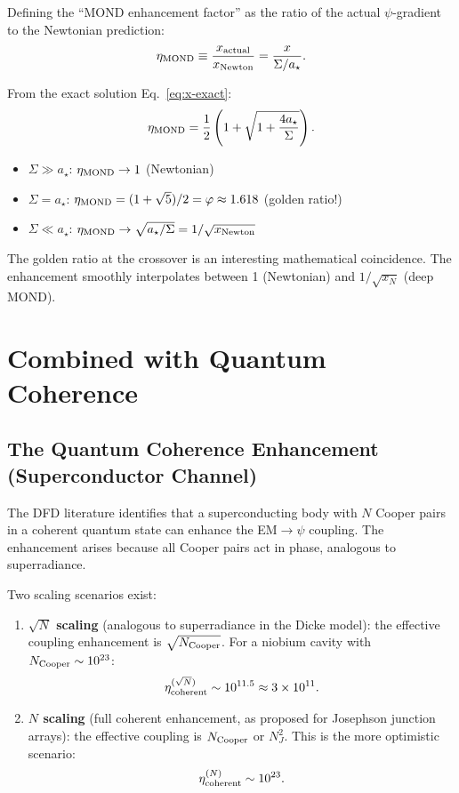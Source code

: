 \documentclass[aps,prd,twocolumn,superscriptaddress,nofootinbib]{revtex4-2}
\newcommand{\astar}{a_\star}
\newcommand{\ee}[1]{\times 10^{#1}}
\begin{document}
Defining the ``MOND enhancement factor'' as the ratio of the
actual $\psi$-gradient to the Newtonian prediction:
\begin{equation}
\eta_{\rm MOND} \equiv \frac{x_{\rm actual}}{x_{\rm Newton}}
= \frac{x}{\Sigma/\astar}.
\end{equation}

From the exact solution Eq.~\eqref{eq:x-exact}:
\begin{equation}
\eta_{\rm MOND} = \frac{1}{2}\left(1 + \sqrt{1 + \frac{4\astar}{\Sigma}}\right).
\end{equation}

\begin{itemize}[nosep]
\item $\Sigma \gg \astar$: $\eta_{\rm MOND} \to 1$ (Newtonian)
\item $\Sigma = \astar$: $\eta_{\rm MOND} = (1+\sqrt{5})/2 = \varphi \approx 1.618$ (golden ratio!)
\item $\Sigma \ll \astar$: $\eta_{\rm MOND} \to \sqrt{\astar/\Sigma} = 1/\sqrt{x_{\rm Newton}}$
\end{itemize}

The golden ratio at the crossover is an interesting mathematical
coincidence.  The enhancement smoothly interpolates between 1
(Newtonian) and $1/\sqrt{x_N}$ (deep MOND).


\section{Combined with Quantum Coherence}\label{sec:combined}

\subsection{The Quantum Coherence Enhancement (Superconductor Channel)}

The DFD literature identifies that a superconducting body with $N$
Cooper pairs in a coherent quantum state can enhance the EM$\to\psi$
coupling.  The enhancement arises because all Cooper pairs act in
phase, analogous to superradiance.

Two scaling scenarios exist:
\begin{enumerate}[nosep]
\item \textbf{$\sqrt{N}$ scaling} (analogous to superradiance in the
Dicke model): the effective coupling enhancement is $\sqrt{N_{\rm Cooper}}$.
For a niobium cavity with $N_{\rm Cooper} \sim 10^{23}$:
\begin{equation}
\eta_{\rm coherent}^{(\sqrt{N})} \sim 10^{11.5} \approx 3\ee{11}.
\end{equation}

\item \textbf{$N$ scaling} (full coherent enhancement, as proposed
for Josephson junction arrays): the effective coupling is
$N_{\rm Cooper}$ or $N_J^2$.  This is the more optimistic scenario:
\begin{equation}
\eta_{\rm coherent}^{(N)} \sim 10^{23}.
\end{equation}
\end{enumerate}
\end{document}
